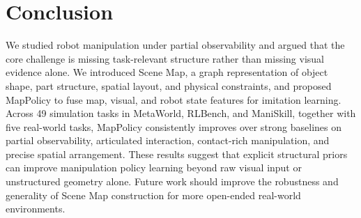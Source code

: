 \section{Conclusion}

We studied robot manipulation under partial observability and argued that the core challenge is missing task-relevant structure rather than missing visual evidence alone. We introduced Scene Map, a graph representation of object shape, part structure, spatial layout, and physical constraints, and proposed MapPolicy to fuse map, visual, and robot state features for imitation learning. Across 49 simulation tasks in MetaWorld, RLBench, and ManiSkill, together with five real-world tasks, MapPolicy consistently improves over strong baselines on partial observability, articulated interaction, contact-rich manipulation, and precise spatial arrangement. These results suggest that explicit structural priors can improve manipulation policy learning beyond raw visual input or unstructured geometry alone. Future work should improve the robustness and generality of Scene Map construction for more open-ended real-world environments.
